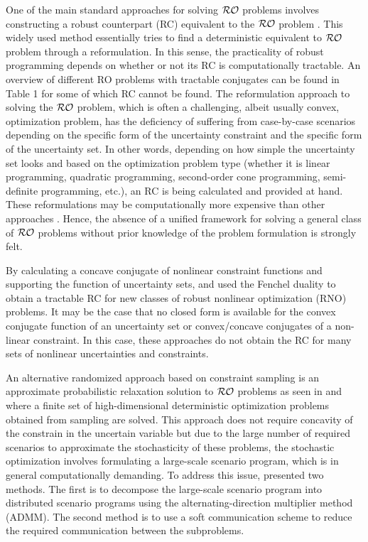 \documentclass[journal,twoside,web]{ieeecolor}
\begin{document}
One of the main standard approaches for solving ${\cal RO}$ problems involves constructing a robust counterpart (RC) equivalent to the ${\cal RO}$ problem \cite{bental2009}. This widely used method essentially tries to find a deterministic equivalent to ${\cal RO}$ problem through a reformulation. In this sense, the practicality of robust programming depends on whether or not its RC is computationally tractable. An overview of different RO problems with tractable conjugates can be found in \cite{gorissen20152} Table 1 for some of which RC cannot be found.
The reformulation approach to solving the ${\cal RO}$ problem, which is often a challenging, albeit usually convex, optimization problem, has the deficiency of suffering from case-by-case scenarios depending on the specific form of the uncertainty constraint and the specific form of the uncertainty set. In other words, depending on how simple the uncertainty set looks and based on the optimization problem type (whether it is linear programming, quadratic programming, second-order cone programming, semi-definite programming, etc.), an RC is being calculated and provided at hand. These reformulations may be computationally more expensive than other approaches \cite{bertsimas2016}. Hence, the absence of a unified framework for solving a general class of ${\cal RO}$ problems without prior knowledge of the problem formulation is strongly felt.

By calculating a concave conjugate of nonlinear constraint functions and supporting the function of uncertainty sets, \cite{bental20152} and \cite{gorissen20152} used the Fenchel duality to obtain a tractable RC for new classes of robust nonlinear optimization (RNO) problems. It may be the case that no closed form is available for the convex conjugate function of an uncertainty set or convex/concave conjugates of a non-linear constraint. In this case, these approaches do not obtain the RC for many sets of nonlinear uncertainties and constraints.

An alternative randomized approach based on constraint sampling is an approximate probabilistic relaxation solution to ${\cal RO}$ problems as seen in \cite{calafiore2004} and \cite{calafiore2010} where a finite set of high-dimensional deterministic optimization problems obtained from sampling are solved. This approach does not require concavity of the constrain in the uncertain variable but due to the large number of required scenarios to approximate the stochasticity of these problems, the stochastic optimization involves formulating a large-scale scenario program, which is in general computationally demanding. To address this issue, \cite{rostampour2021} presented two methods. The first is to decompose the large-scale scenario program into distributed scenario programs using the alternating-direction multiplier method (ADMM). The second method is to use a soft communication scheme to reduce the required communication between the subproblems.
\end{document}
